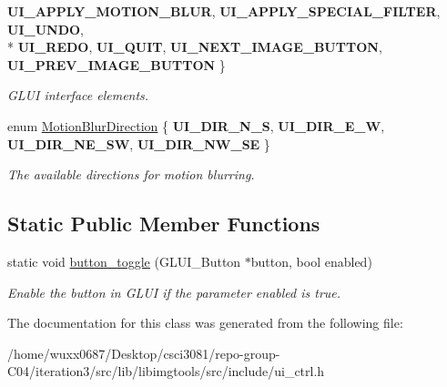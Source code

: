 \begin{DoxyCompactItemize}
{\bfseries U\+I\+\_\+\+A\+P\+P\+L\+Y\+\_\+\+M\+O\+T\+I\+O\+N\+\_\+\+B\+L\+UR}, 
{\bfseries U\+I\+\_\+\+A\+P\+P\+L\+Y\+\_\+\+S\+P\+E\+C\+I\+A\+L\+\_\+\+F\+I\+L\+T\+ER}, 
{\bfseries U\+I\+\_\+\+U\+N\+DO}, 
\\*
{\bfseries U\+I\+\_\+\+R\+E\+DO}, 
{\bfseries U\+I\+\_\+\+Q\+U\+IT}, 
{\bfseries U\+I\+\_\+\+N\+E\+X\+T\+\_\+\+I\+M\+A\+G\+E\+\_\+\+B\+U\+T\+T\+ON}, 
{\bfseries U\+I\+\_\+\+P\+R\+E\+V\+\_\+\+I\+M\+A\+G\+E\+\_\+\+B\+U\+T\+T\+ON}
 \}\hypertarget{classimage__tools_1_1UICtrl_a94c1180d7f5541b2d52d0f56ff6dfbd6}{}\label{classimage__tools_1_1UICtrl_a94c1180d7f5541b2d52d0f56ff6dfbd6}
\begin{DoxyCompactList}\small\item\em G\+L\+UI interface elements. \end{DoxyCompactList}
\item 
enum \hyperlink{classimage__tools_1_1UICtrl_a56d4f68bf91302769d7bc453d8d57cee}{Motion\+Blur\+Direction} \{ {\bfseries U\+I\+\_\+\+D\+I\+R\+\_\+\+N\+\_\+S}, 
{\bfseries U\+I\+\_\+\+D\+I\+R\+\_\+\+E\+\_\+W}, 
{\bfseries U\+I\+\_\+\+D\+I\+R\+\_\+\+N\+E\+\_\+\+SW}, 
{\bfseries U\+I\+\_\+\+D\+I\+R\+\_\+\+N\+W\+\_\+\+SE}
 \}\hypertarget{classimage__tools_1_1UICtrl_a56d4f68bf91302769d7bc453d8d57cee}{}\label{classimage__tools_1_1UICtrl_a56d4f68bf91302769d7bc453d8d57cee}
\begin{DoxyCompactList}\small\item\em The available directions for motion blurring. \end{DoxyCompactList}
\end{DoxyCompactItemize}
\subsection*{Static Public Member Functions}
\begin{DoxyCompactItemize}
\item 
static void \hyperlink{classimage__tools_1_1UICtrl_ab69f0e1ea369485305d87820b61e1a50}{button\+\_\+toggle} (G\+L\+U\+I\+\_\+\+Button $\ast$button, bool enabled)\hypertarget{classimage__tools_1_1UICtrl_ab69f0e1ea369485305d87820b61e1a50}{}\label{classimage__tools_1_1UICtrl_ab69f0e1ea369485305d87820b61e1a50}

\begin{DoxyCompactList}\small\item\em Enable the button in G\+L\+UI if the parameter enabled is true. \end{DoxyCompactList}\end{DoxyCompactItemize}


The documentation for this class was generated from the following file\+:\begin{DoxyCompactItemize}
\item 
/home/wuxx0687/\+Desktop/csci3081/repo-\/group-\/\+C04/iteration3/src/lib/libimgtools/src/include/ui\+\_\+ctrl.\+h\end{DoxyCompactItemize}

